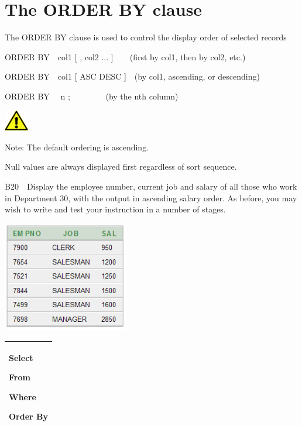 \section[The ORDER BY clause]{The ORDER BY clause}
The ORDER BY clause is used to control the display order of selected records

ORDER BY\ \ col1 [ , col2 ... ]\ \ \ \ (first by col1, then by col2, etc.)

ORDER BY\ \ col1  [ ASC {\textbar} DESC ]\ \ (by col1, ascending, or descending)

ORDER BY \ \ n ; \ \ \ \ \ \ \ \ (by the nth column)



\begin{center}
  
\includegraphics[width=1.076cm,height=0.917cm]{images/img (2).png}

\end{center}
Note: The default ordering is ascending.

Null values are always displayed first regardless of sort sequence.

B20\ \ Display the employee number, current job and salary of all those who work in Department 30, with the output in ascending salary order.  As before, you may wish to write and test your instruction in a number of stages.



\begin{center}
  
\includegraphics[width=5.514cm,height=4.835cm]{images/img (29).png}

\end{center}
\begin{flushleft}
\tablefirsthead{}
\tablehead{}
\tabletail{}
\tablelasttail{}
\begin{supertabular}{|m{9.482cm}|}
\hline
Select 

From

Where

Order By\\\hline
\end{supertabular}
\end{flushleft}


